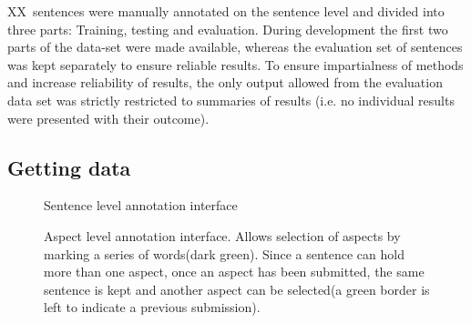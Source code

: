 \documentclass[a4paper,11pt]{kth-mag}
\newcommand{\numAnnotated}{XX}
\newif\ifhasStudiedFailures
\begin{document}
\numAnnotated~sentences were manually annotated on the sentence level and divided into three parts: Training, testing and evaluation. During development the first two parts of the data-set were made available, whereas the evaluation set of sentences was kept separately to ensure reliable results. To ensure impartialness of methods and increase reliability of results, the only output allowed from the evaluation data set was strictly restricted to summaries of results (i.e. no individual results were presented with their outcome)\ifhasStudiedFailures, except for when failing instances were explicitly studied after method development was finished\fi.

\newpage
\subsection{Getting data}
\begin{figure}[h]
  \centering
  \caption{Sentence level annotation interface}
  \label{fig:annotate_sentence}
\end{figure}

\begin{figure}[h]
  \centering
  \caption{Aspect level annotation interface. Allows selection of aspects by marking a series of words(dark green). Since a sentence can hold more than one aspect, once an aspect has been submitted, the same sentence is kept and another aspect can be selected(a green border is left to indicate a previous submission).}
  \label{fig:annotate_aspect}
\end{figure}
\end{document}

